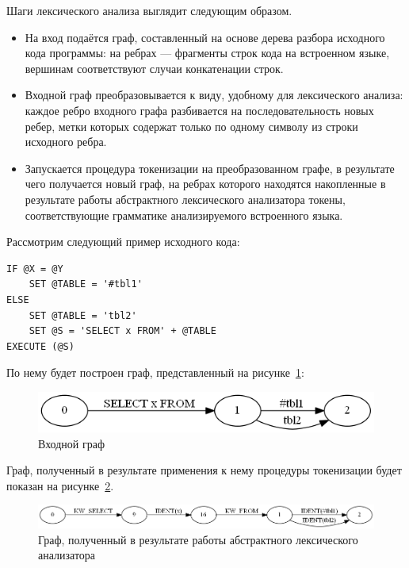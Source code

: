 Шаги лексического анализа выглядит следующим образом.
\begin{itemize}
    \item На вход подаётся граф, составленный на основе дерева разбора исходного 
    кода программы: на ребрах — фрагменты строк кода на встроенном языке, 
    вершинам соответствуют случаи конкатенации строк.
    \item Входной граф преобразовывается к виду, удобному для лексического 
    анализа: каждое ребро входного графа разбивается на последовательность новых 
    ребер, метки которых содержат только по одному символу из строки исходного 
    ребра.
    \item Запускается процедура токенизации на преобразованном графе, в 
    результате чего получается новый граф, на ребрах которого находятся 
    накопленные в результате работы абстрактного лексического анализатора 
    токены, соответствующие грамматике анализируемого встроенного языка.
\end{itemize}

Рассмотрим следующий пример исходного кода:

\begin{verbatim}
IF @X = @Y
    SET @TABLE = '#tbl1'
ELSE
    SET @TABLE = 'tbl2'
    SET @S = 'SELECT x FROM' + @TABLE
EXECUTE (@S)
\end{verbatim}

По нему будет построен граф, представленный на рисунке~\ref{SimpleSql}:
\begin{figure}[h]
 \label{SimpleSql}
 \centering
 \includegraphics[width=15cm]{Verbitskaya/SimpleSql.png}
 \caption{Входной граф}
 \label{SimpleSql}
\end{figure}

Граф, полученный в результате применения к нему процедуры токенизации будет 
показан на рисунке~\ref{SimpleSqlLex}.
\begin{figure}[h]
 \label{SimpleSqlLex}
 \centering
 \includegraphics[width=15cm]{Verbitskaya/SimpleSql_lex.png}
 \caption{Граф, полученный в результате работы абстрактного лексического анализатора}
 \label{SimpleSqlLex}
\end{figure}

